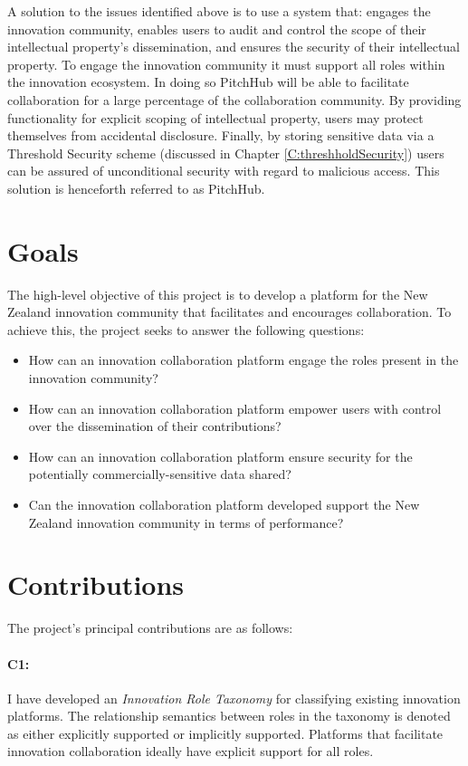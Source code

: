 A solution to the issues identified above is to use a system that: engages the innovation community, enables users to audit and control the scope of their intellectual property's dissemination, and ensures the security of their intellectual property. To engage the innovation community it must support all roles within the innovation ecosystem. In doing so PitchHub will be able to facilitate collaboration for a large percentage of the collaboration community. By providing functionality for explicit scoping of intellectual property, users may protect themselves from accidental disclosure. Finally, by storing sensitive data via a Threshold Security scheme (discussed in Chapter \ref{C:threshholdSecurity}) users can be assured of unconditional security with regard to malicious access. This solution is henceforth referred to as PitchHub.

\section{Goals}\label{S:goals}

The high-level objective of this project is to develop a platform for the New Zealand innovation community that facilitates and encourages collaboration. To achieve this, the project seeks to answer the following questions: 

\begin{itemize}
  \item How can an innovation collaboration platform engage the roles present in the innovation community?
  \item How can an innovation collaboration platform empower users with control over the dissemination of their contributions?
  \item How can an innovation collaboration platform ensure security for the potentially commercially-sensitive data shared?
  \item Can the innovation collaboration platform developed support the New Zealand innovation community in terms of performance?
\end{itemize}

\section{Contributions}

The project's principal contributions are as follows:

\paragraph{C1:} I have developed an {\em Innovation Role Taxonomy} for classifying existing innovation platforms. The relationship semantics between roles in the taxonomy is denoted as either explicitly supported or implicitly supported. Platforms that facilitate innovation collaboration ideally have explicit support for all roles.

